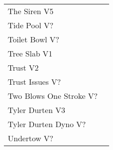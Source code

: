 \begin{center}
\begin{supertabular}{lr}
The Siren V5 & \pageref{rt:The Siren} \\
Tide Pool V? & \pageref{rt:Tide Pool} \\
Toilet Bowl V? & \pageref{rt:Toilet Bowl} \\
Tree Slab V1 & \pageref{rt:Tree Slab} \\
Trust V2 & \pageref{rt:Trust} \\
Trust Issues V? & \pageref{rt:Trust Issues} \\
Two Blows One Stroke V? & \pageref{rt:Two Blows One Stroke} \\
Tyler Durten V3 & \pageref{rt:Tyler Durten} \\
Tyler Durten Dyno V? & \pageref{vr:Tyler Durten Dyno} \\
Undertow V? & \pageref{rt:Undertow} \\
\end{supertabular}
\end{center}
